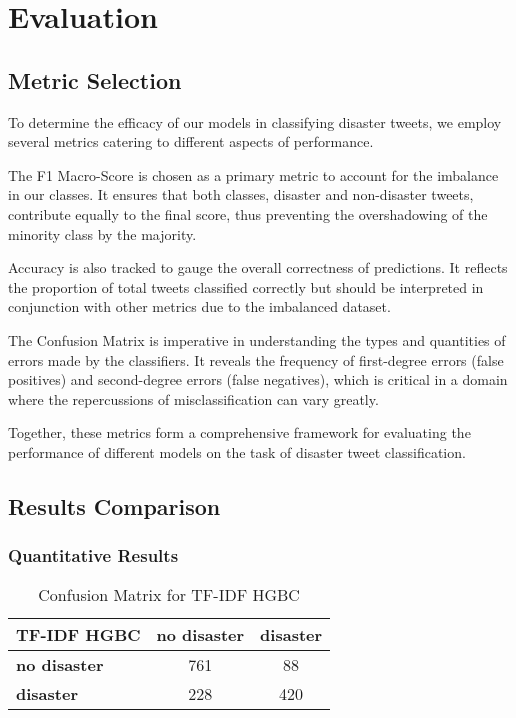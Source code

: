 \documentclass[10pt,table]{article}
\begin{document}
\section{Evaluation}

\subsection{Metric Selection}
To determine the efficacy of our models in classifying disaster tweets, we employ several metrics catering to different aspects of performance.

The F1 Macro-Score is chosen as a primary metric to account for the imbalance in our classes. It ensures that both classes, disaster and non-disaster tweets, contribute equally to the final score, thus preventing the overshadowing of the minority class by the majority.

Accuracy is also tracked to gauge the overall correctness of predictions. It reflects the proportion of total tweets classified correctly but should be interpreted in conjunction with other metrics due to the imbalanced dataset.

The Confusion Matrix is imperative in understanding the types and quantities of errors made by the classifiers. It reveals the frequency of first-degree errors (false positives) and second-degree errors (false negatives), which is critical in a domain where the repercussions of misclassification can vary greatly.

Together, these metrics form a comprehensive framework for evaluating the performance of different models on the task of disaster tweet classification.

\subsection{Results Comparison}


\subsubsection{Quantitative Results}

\begin{table}[h]
    \centering
    \begin{tabular}{lcc}
    \hline
    \textbf{TF-IDF HGBC} & \textbf{no disaster} & \textbf{disaster} \\ \hline
    \textbf{no disaster} & 761                   & 88               \\
    \textbf{disaster}    & 228                   & 420              \\ \hline
    \end{tabular}
    \caption{Confusion Matrix for TF-IDF HGBC}
\end{table}
\end{document}
